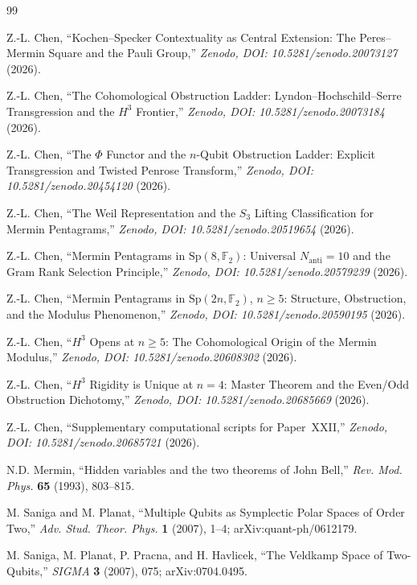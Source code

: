 \documentclass[11pt,a4paper]{article}
\newcommand{\Sp}{\mathrm{Sp}}
\newcommand{\F}{\mathbb{F}}
\theoremstyle{plain}
\theoremstyle{definition}
\theoremstyle{remark}
\begin{document}
\begin{thebibliography}{99}

Z.-L. Chen, ``Kochen--Specker Contextuality as Central Extension:
The Peres--Mermin Square and the Pauli Group,''
\textit{Zenodo, DOI: 10.5281/zenodo.20073127} (2026).

Z.-L. Chen, ``The Cohomological Obstruction Ladder:
Lyndon--Hochschild--Serre Transgression and the $H^3$ Frontier,''
\textit{Zenodo, DOI: 10.5281/zenodo.20073184} (2026).

Z.-L. Chen, ``The $\Phi$ Functor and the $n$-Qubit Obstruction Ladder:
Explicit Transgression and Twisted Penrose Transform,''
\textit{Zenodo, DOI: 10.5281/zenodo.20454120} (2026).

Z.-L. Chen, ``The Weil Representation and the $S_3$ Lifting Classification
for Mermin Pentagrams,''
\textit{Zenodo, DOI: 10.5281/zenodo.20519654} (2026).

Z.-L. Chen, ``Mermin Pentagrams in $\Sp(8,\F_2)$:
Universal $N_{\mathrm{anti}}=10$ and the Gram Rank Selection Principle,''
\textit{Zenodo, DOI: 10.5281/zenodo.20579239} (2026).

Z.-L. Chen, ``Mermin Pentagrams in $\Sp(2n,\F_2)$, $n\ge5$:
Structure, Obstruction, and the Modulus Phenomenon,''
\textit{Zenodo, DOI: 10.5281/zenodo.20590195} (2026).

Z.-L. Chen, ``$H^3$ Opens at $n\ge5$:
The Cohomological Origin of the Mermin Modulus,''
\textit{Zenodo, DOI: 10.5281/zenodo.20608302} (2026).

Z.-L. Chen, ``$H^3$ Rigidity is Unique at $n=4$:
Master Theorem and the Even/Odd Obstruction Dichotomy,''
\textit{Zenodo, DOI: 10.5281/zenodo.20685669} (2026).

Z.-L. Chen, ``Supplementary computational scripts for Paper~XXII,''
\textit{Zenodo, DOI: 10.5281/zenodo.20685721} (2026).

N.D. Mermin,
``Hidden variables and the two theorems of John Bell,''
\textit{Rev. Mod. Phys.} \textbf{65} (1993), 803--815.

M. Saniga and M. Planat,
``Multiple Qubits as Symplectic Polar Spaces of Order Two,''
\textit{Adv. Stud. Theor. Phys.} \textbf{1} (2007), 1--4;
arXiv:quant-ph/0612179.

M. Saniga, M. Planat, P. Pracna, and H. Havlicek,
``The Veldkamp Space of Two-Qubits,''
\textit{SIGMA} \textbf{3} (2007), 075;
arXiv:0704.0495.

\end{thebibliography}
\end{document}
